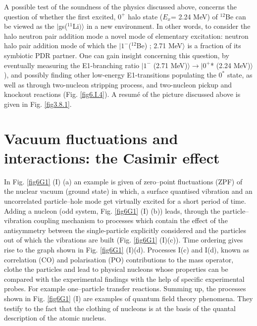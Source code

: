 \begin{subappendices}
A  possible test of the soundness of the physics  discussed above, concerns the question of whether the first excited, 
$0^+$ halo state ($E_x$= 2.24 MeV) of $^{12}$Be can be viewed as the $|$gs($^{11}$Li$)\rangle$ in a new environment. In other words, 
to consider the halo neutron pair addition mode
 a novel mode of  elementary excitation: neutron halo pair  addition mode of which the $|1^- $($^{12}$Be) ; 2.71 MeV$\rangle $ is 
 a fraction of  its symbiotic  PDR partner. One can gain insight concerning this question, by 
 eventually measuring the E1-branching ratio $|1^-$ (2.71 MeV)$\rangle  \to |0^+$* (2.24 MeV)$\rangle$ ), and possibly 
 finding other low-energy E1-transitions populating the $0^*$ state, as well as through  two-nucleon stripping process,
 and two-nucleon pickup and knockout reactions (Fig. \ref{fig6.I.4}).
 A resum\'e of the picture discussed above is given   in Fig. \ref{fig3.8.1}. 
 \section[Vacuum fluctuations: the Casimir effect]{Vacuum fluctuations and interactions: the Casimir effect}
In Fig. \ref{fig6G1} (I) (a) an example is given of  zero--point fluctuations (ZPF) of the nuclear vacuum (ground state) in which, a surface quantised vibration and an uncorrelated particle--hole mode get virtually excited for a short period of time.  Adding 
a nucleon (odd system, Fig. \ref{fig6G1} (I) (b)) leads, through the particle--vibration coupling mechanism to processes which contain the effect of the antisymmetry between the single-particle explicitly considered and the particles out of which  the vibrations are built  (Fig. \ref{fig6G1} (I)(c)). Time ordering 
gives rise to the graph shown in Fig. \ref{fig6G1} (I)(d). Processes I(c) and I(d),  known as correlation (CO) and polarisation (PO) contributions to the mass
operator,  clothe the particles and lead to physical nucleons  whose properties can be compared with the experimental findings with the help of specific experimental probes. For example one--particle transfer reactions. Summing up, 
the processes shown in Fig. \ref{fig6G1} (I) are examples of quantum field theory phenomena. They testify  to the fact that the clothing of nucleons is at the basis of the quantal description of the atomic nucleus. 


\end{subappendices}
